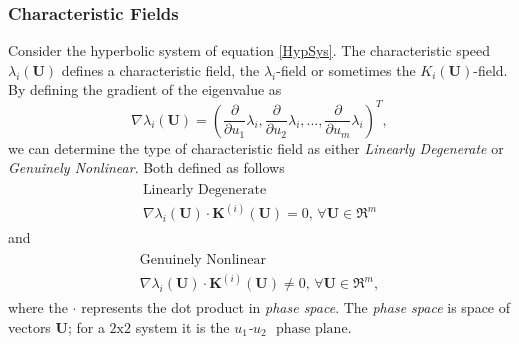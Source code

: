 \documentclass[]{article}
\begin{document}
		\subsubsection{Characteristic Fields}
		Consider the hyperbolic system of equation \ref{HypSys}. The characteristic speed $ \lambda_i(\textbf{U}) $ defines a characteristic field, the $ \lambda_i $-field or sometimes the $ K_i(\textbf{U}) $-field. By defining the gradient of the eigenvalue as
		\begin{equation}
		\nabla \lambda_i(\textbf{U}) = (\frac{\partial}{\partial u_1}\lambda_i, \frac{\partial}{\partial u_2}\lambda_i,..., \frac{\partial}{\partial u_m}\lambda_i)^T,
		\end{equation}
		we can determine the type of characteristic field as either \textit{Linearly Degenerate} or \textit{Genuinely Nonlinear}. Both defined as follows
		\begin{equation}
		\begin{aligned}
		\begin{array}{ll}
		\mbox{Linearly Degenerate} \\
		\nabla \lambda_i(\textbf{U}) \cdot \textbf{K}^{(i)}(\textbf{U}) = 0 \mbox{, } \forall\textbf{U} \in \Re^m
		\end{array}
		\end{aligned}			
		\end{equation}
		and
		\begin{equation} 
		\begin{aligned}
		\begin{array}{ll}
		\mbox{Genuinely Nonlinear} \\
		\nabla \lambda_i(\textbf{U}) \cdot \textbf{K}^{(i)}(\textbf{U}) \ne 0 \mbox{, } \forall\textbf{U} \in \Re^m,
		\end{array}
		\end{aligned}			
		\end{equation}
		where the $ \cdot $ represents the dot product in \textit{phase space}. The \textit{phase space} is space of vectors $ \textbf{U} $; for a $ 2 \mbox{x} 2 $ system it is the \textit{$ u_1 $-$ u_2 $} $ \mbox{ phase plane}$.
		
\end{document}
